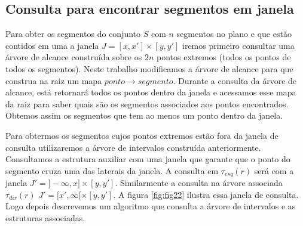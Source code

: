 \subsection{Consulta para encontrar segmentos em janela}
Para obter os segmentos do conjunto $S$ com $n$ segmentos no plano e que estão contidos em uma a janela $J=[x,x']\times[y, y']$ iremos primeiro consultar uma árvore de alcance construída sobre os $2n$ pontos extremos (todos os pontos de todos os segmentos). Neste trabalho modificamos a árvore de alcance para que construa na raiz um mapa $ponto \rightarrow segmento$. Durante a consulta da árvore de alcance, está retornará todos os pontos dentro da janela e acessamos esse mapa da raiz para saber quais são os segmentos associados aos pontos encontrados. Obtemos assim os segmentos que tem ao menos um ponto dentro da janela.

Para obtermos os segmentos cujos pontos extremos estão fora da janela de consulta utilizaremos a árvore de intervalos construída anteriormente. Consultamos a estrutura auxiliar com uma janela que garante que o ponto do segmento cruza uma das laterais da janela. A consulta em $\tau_{esq}(r)$ será com a janela $J'=]-\infty, x] \times [y, y']$. Similarmente a consulta na árvore associada $\tau_{dir}(r)$  $J'=[x', \infty[ \times [y, y']$. A figura \ref{fig:fig22} ilustra essa janela de consulta. Logo depois descrevemos um algoritmo que consulta a árvore de intervalos e as estruturas associadas.

